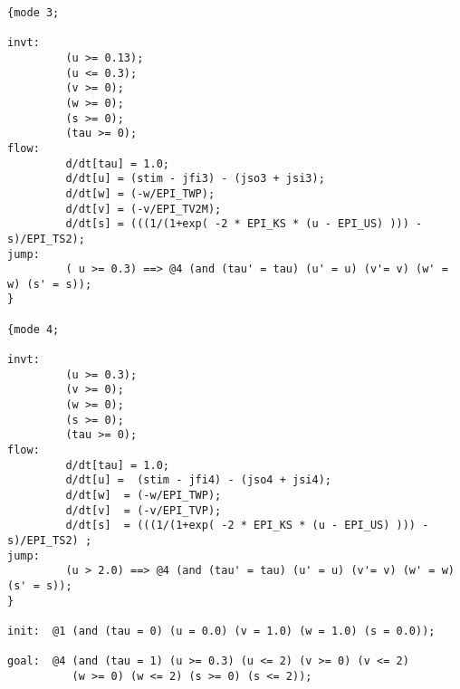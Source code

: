 \begin{verbatim}
{mode 3;

invt:
         (u >= 0.13);
         (u <= 0.3);
         (v >= 0);
         (w >= 0);
         (s >= 0);
         (tau >= 0);
flow:
         d/dt[tau] = 1.0;
         d/dt[u] = (stim - jfi3) - (jso3 + jsi3);
         d/dt[w] = (-w/EPI_TWP);
         d/dt[v] = (-v/EPI_TV2M);
         d/dt[s] = (((1/(1+exp( -2 * EPI_KS * (u - EPI_US) ))) - s)/EPI_TS2);
jump:
         ( u >= 0.3) ==> @4 (and (tau' = tau) (u' = u) (v'= v) (w' = w) (s' = s));
}

{mode 4;

invt:
         (u >= 0.3);
         (v >= 0);
         (w >= 0);
         (s >= 0);
         (tau >= 0);
flow:
         d/dt[tau] = 1.0;
         d/dt[u] =  (stim - jfi4) - (jso4 + jsi4);
         d/dt[w]  = (-w/EPI_TWP);
         d/dt[v]  = (-v/EPI_TVP);
         d/dt[s]  = (((1/(1+exp( -2 * EPI_KS * (u - EPI_US) ))) - s)/EPI_TS2) ;
jump:
         (u > 2.0) ==> @4 (and (tau' = tau) (u' = u) (v'= v) (w' = w) (s' = s));
}

init:  @1 (and (tau = 0) (u = 0.0) (v = 1.0) (w = 1.0) (s = 0.0));

goal:  @4 (and (tau = 1) (u >= 0.3) (u <= 2) (v >= 0) (v <= 2) 
          (w >= 0) (w <= 2) (s >= 0) (s <= 2));
\end{verbatim}

